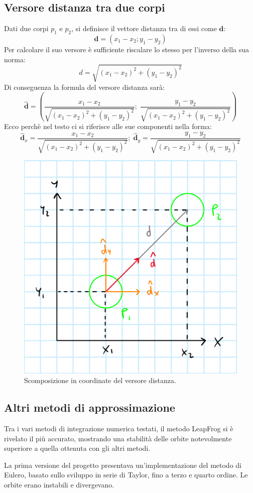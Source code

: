 \documentclass{article}
\begin{document}
\subsection{Versore distanza tra due corpi}
\label{ap1}
Dati due corpi $p_{1}$ e $p_{2}$, si definisce il vettore distanza tra di essi come $\textbf{d}$:
\begin{equation}
    \textbf{d}=(x_{1}-x_{2}; y_{1}-y_{2})
\end{equation}
Per calcolare il suo versore è sufficiente riscalare lo stesso per l'inverso della sua norma:
\begin{equation}
    d=\sqrt{(x_{1}-x_{2})^2+(y_{1}-y_{2})^2}
\end{equation}
Di conseguenza la formula del versore distanza sarà:
\begin{equation}
    \mathbf{\hat{d}}=(\frac{x_{1}-x_{2}}{\sqrt{(x_{1}-x_{2})^2+(y_{1}-y_{2})^2}}; \; \frac{y_{1}-y_{2}}{\sqrt{(x_{1}-x_{2})^2+(y_{1}-y_{2})^2}})   
\end{equation}
Ecco perchè nel testo ci si riferisce alle sue componenti nella forma:
\begin{equation}
    \mathbf{\hat{d}}_{x}=\frac{x_{1}-x_{2}}{\sqrt{(x_{1}-x_{2})^2+(y_{1}-y_{2})^2}} ;\; \mathbf{\hat{d}}_{y}=\frac{y_{1}-y_{2}}{\sqrt{(x_{1}-x_{2})^2+(y_{1}-y_{2})^2}}
\end{equation}

\begin{figure} [H]
    \centering
    \includegraphics[height=.20\linewidth]{VersoreDistanza.png}
    \caption{Scomposizione in coordinate del versore distanza.}
\end{figure}


\subsection{Altri metodi di approssimazione}
\label{ap2}
Tra i vari metodi di integrazione numerica testati, il metodo LeapFrog si è rivelato il più accurato, mostrando una stabilità delle orbite notevolmente superiore a quella ottenuta con gli altri metodi.

La prima versione del progetto presentava un'implementazione del metodo di Eulero, basato sullo sviluppo in serie di Taylor, fino a terzo e quarto ordine. Le orbite erano instabili e divergevano.
\end{document}
